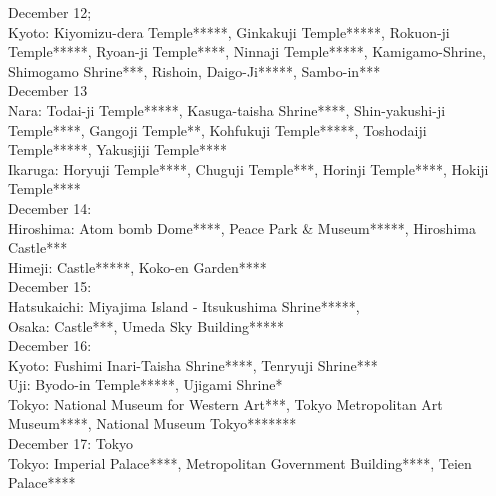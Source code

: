 December 12;\\
Kyoto: Kiyomizu-dera  Temple*****, Ginkakuji  Temple*****, Rokuon-ji  Temple*****, Ryoan-ji Temple****, Ninnaji Temple*****, Kamigamo-Shrine, Shimogamo Shrine***, Rishoin, Daigo-Ji*****, Sambo-in***\\

December 13\\
Nara: Todai-ji Temple*****, Kasuga-taisha Shrine****, Shin-yakushi-ji Temple****, Gangoji Temple**, Kohfukuji Temple*****, Toshodaiji Temple*****, Yakusjiji Temple****\\
Ikaruga: Horyuji Temple****, Chuguji Temple***, Horinji Temple****, Hokiji Temple****\\

December 14:\\
Hiroshima: Atom bomb Dome****, Peace Park \& Museum*****, Hiroshima Castle***\\
Himeji: Castle*****, Koko-en Garden****\\

December 15:\\
Hatsukaichi: Miyajima Island - Itsukushima Shrine*****,\\
Osaka: Castle***, Umeda Sky Building*****\\

December 16:\\
Kyoto: Fushimi Inari-Taisha Shrine****, Tenryuji Shrine***\\
Uji: Byodo-in Temple*****, Ujigami Shrine*\\
Tokyo: National Museum for Western Art***, Tokyo Metropolitan Art Museum****, National Museum Tokyo*******\\

December 17: Tokyo\\
Tokyo: Imperial Palace****, Metropolitan Government Building****, Teien Palace****